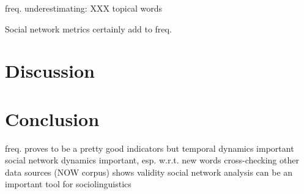 \documentclass[draft, a4paper, abstract=on]{scrartcl}
\begin{document}
  freq. underestimating: XXX
  topical words

  Social network metrics certainly add to freq.

\section{Discussion}
\section{Conclusion}

freq. proves to be a pretty good indicators
but
temporal dynamics important
social network dynamics important, esp. w.r.t. new words
cross-checking other data sources (NOW corpus) shows validity
social network analysis can be an important tool for sociolinguistics


\printbibliography
\end{document}
